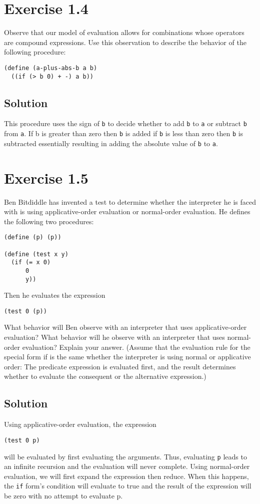 \documentclass[11pt]{article}
\begin{document}
\section{Exercise 1.4}
\label{sec:orgc53f9cb}
Observe that our model of evaluation allows for combinations whose
operators are compound expressions. Use this observation to describe the
behavior of the following procedure:
\begin{verbatim}
(define (a-plus-abs-b a b)
  ((if (> b 0) + -) a b))
\end{verbatim}
\subsection{Solution}
\label{sec:orgcd5735c}
This procedure uses the sign of \texttt{b} to decide whether to add \texttt{b} to \texttt{a} or
subtract \texttt{b} from \texttt{a}. If b is greater than zero then \texttt{b} is added if \texttt{b} is
less than zero then \texttt{b} is subtracted essentially resulting in adding the
absolute value of \texttt{b} to \texttt{a}.

\section{Exercise 1.5}
\label{sec:org3533fd2}
Ben Bitdiddle has invented a test to determine whether the interpreter
he is faced with is using applicative-order evaluation or normal-order
evaluation. He defines the following two procedures:
\begin{verbatim}
(define (p) (p))

(define (test x y)
  (if (= x 0)
      0
      y))
\end{verbatim}

Then he evaluates the expression
\begin{verbatim}
(test 0 (p))
\end{verbatim}

What behavior will Ben observe with an interpreter that uses
applicative-order evaluation? What behavior will he observe with an
interpreter that uses normal-order evaluation? Explain your
answer. (Assume that the evaluation rule for the special form if is the
same whether the interpreter is using normal or applicative order: The
predicate expression is evaluated first, and the result determines
whether to evaluate the consequent or the alternative expression.)
\subsection{Solution}
\label{sec:org1acbaa2}
Using applicative-order evaluation, the expression
\begin{verbatim}
(test 0 p)
\end{verbatim}
will be evaluated by first evaluating the arguments. Thus, evaluating
\texttt{p} leads to an infinite recursion and the evaluation will never
complete. Using normal-order evaluation, we will first expand the
expression then reduce. When this happens, the \texttt{if} form's condition
will evaluate to true and the result of the expression will be zero
with no attempt to evaluate p.
\end{document}
